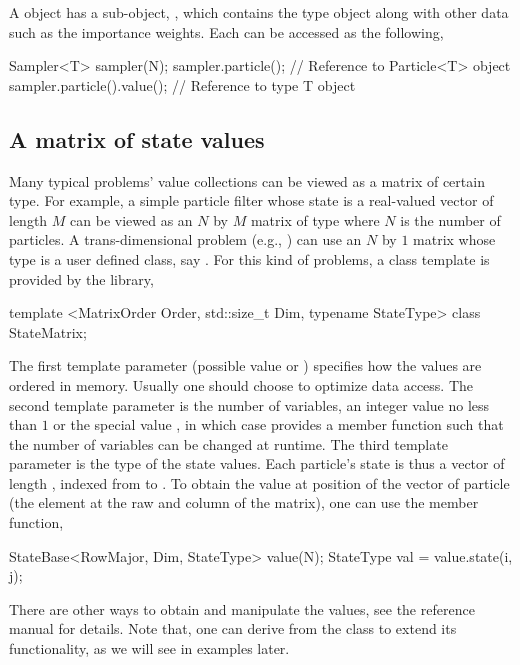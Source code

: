 A  object has a sub-object, , which contains the type  object along with other data such as the importance weights. Each can be accessed as the following,
\begin{cppcode}
Sampler<T> sampler(N);
sampler.particle();         // Reference to Particle<T> object
sampler.particle().value(); // Reference to type T object
\end{cppcode}

\subsection{A matrix of state values}
\label{sub:A matrix of state values}

Many typical problems' value collections can be viewed as a matrix of certain type. For example, a simple particle filter whose state is a real-valued vector of length $M$ can be viewed as an $N$ by $M$ matrix of type  where $N$ is the number of particles. A trans-dimensional problem (e.g., \cite{Jasra:2008bb}) can use an $N$ by $1$ matrix whose type is a user defined class, say . For this kind of problems, a class template is provided by the library,
\begin{cppcode}
template <MatrixOrder Order, std::size_t Dim, typename StateType>
class StateMatrix;
\end{cppcode}
The first template parameter (possible value  or ) specifies how the values are ordered in memory. Usually one should choose  to optimize data access. The second template parameter is the number of variables, an integer value no less than $1$ or the special value , in which case  provides a member function  such that the number of variables can be changed at runtime. The third template parameter is the type of the state values. Each particle's state is thus a vector of length , indexed from  to . To obtain the value at position  of the vector of particle  (the element at the \xth raw and \xth column of the matrix), one can use the  member function,
\begin{cppcode}
StateBase<RowMajor, Dim, StateType> value(N);
StateType val = value.state(i, j);
\end{cppcode}
There are other ways to obtain and manipulate the values, see the reference manual for details. Note that, one can derive from the  class to extend its functionality, as we will see in examples later.

